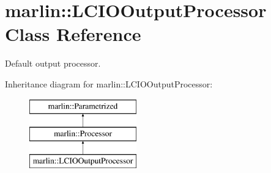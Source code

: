 \section{marlin\+:\+:L\+C\+I\+O\+Output\+Processor Class Reference}
\label{classmarlin_1_1LCIOOutputProcessor}


Default output processor.  


Inheritance diagram for marlin\+:\+:L\+C\+I\+O\+Output\+Processor\+:\begin{figure}[H]
\begin{center}
\leavevmode
\includegraphics[height=3.000000cm]{classmarlin_1_1LCIOOutputProcessor}
\end{center}
\end{figure}

